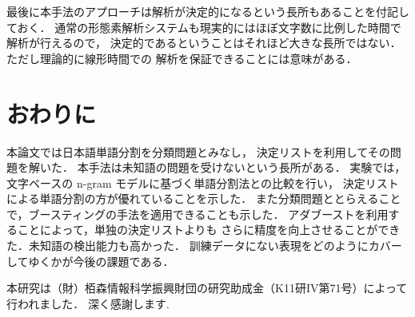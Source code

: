 最後に本手法のアプローチは解析が決定的になるという長所もあることを付記しておく\cite{shinnou00}．
通常の形態素解析システムも現実的にはほぼ文字数に比例した時間で解析が行えるので，
決定的であるということはそれほど大きな長所ではない．ただし理論的に線形時間での
解析を保証できることには意味がある．


\section{おわりに}


本論文では日本語単語分割を分類問題とみなし，
決定リストを利用してその問題を解いた．
本手法は未知語の問題を受けないという長所がある．
実験では，文字ベースの n-gram モデルに基づく単語分割法との比較を行い，
決定リストによる単語分割の方が優れていることを示した．
また分類問題ととらえることで，ブースティングの手法を適用できることも示した．
アダブーストを利用することによって，単独の決定リストよりも
さらに精度を向上させることができた．未知語の検出能力も高かった．
訓練データにない表現をどのようにカバーしてゆくかが今後の課題である．

\acknowledgment

本研究は（財）栢森情報科学振興財団の研究助成金（K11研IV第71号）によって行われました．
深く感謝します.






\newpage

\begin{biography}

\end{biography}





